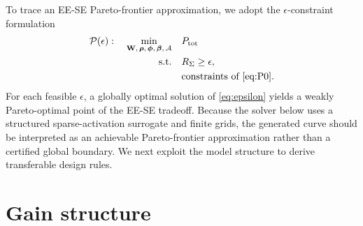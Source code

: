 \documentclass[journal]{IEEEtran}
\begin{document}
To trace an EE-SE Pareto-frontier approximation, we adopt the $\epsilon$-constraint formulation
\begin{equation}
\begin{aligned}
\mathcal{P}(\epsilon):\quad
\min_{\mathbf{W},\,\bm{\rho},\,\bm{\phi},\,\bm{\beta},\,\mathcal{A}}
\quad & P_{\mathrm{tot}} \\
\text{s.t.}\quad &
R_\Sigma \ge \epsilon, \\
& \text{constraints of \eqref{eq:P0}.}
\end{aligned}
\label{eq:epsilon}
\end{equation}
For each feasible $\epsilon$, a globally optimal solution of \eqref{eq:epsilon} yields a weakly Pareto-optimal point of the EE-SE tradeoff. Because the solver below uses a structured sparse-activation surrogate and finite grids, the generated curve should be interpreted as an achievable Pareto-frontier approximation rather than a certified global boundary. We next exploit the model structure to derive transferable design rules.


\section{Gain structure}
\end{document}

